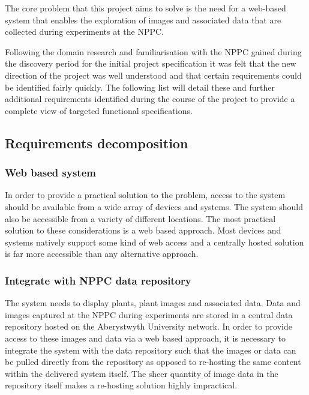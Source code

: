 
The core problem that this project aims to solve is the need for a web-based system that enables the exploration of images and associated data that are collected during experiments at the NPPC. 


 Following the domain research and familiarisation with the NPPC gained during the discovery period for the initial project specification it was felt that the new direction of the project was well understood and that certain requirements could be identified fairly quickly. The following list will detail these and further additional requirements identified during the course of the project to provide a complete view of targeted functional specifications.


\subsection{Requirements decomposition}


\subsubsection{Web based system} In order to provide a practical solution to the problem, access to the system should be available from a wide array of devices and systems. The system should also be accessible from a variety of different locations. The most practical solution to these considerations is a web based approach. Most devices and systems natively support some kind of web access and a centrally hosted solution is far more accessible than any alternative approach.


\subsubsection{Integrate with NPPC data repository} The system needs to display plants, plant images and associated data. Data and images captured at the NPPC during experiments are stored in a central data repository hosted on the Aberystwyth University network. In order to provide access to these images and data via a web based approach, it is necessary to integrate the system with the data repository such that the images or data can be pulled directly from the repository as opposed to re-hosting the same content within the delivered system itself. The sheer quantity of image data in the repository itself makes a re-hosting solution highly impractical. 

